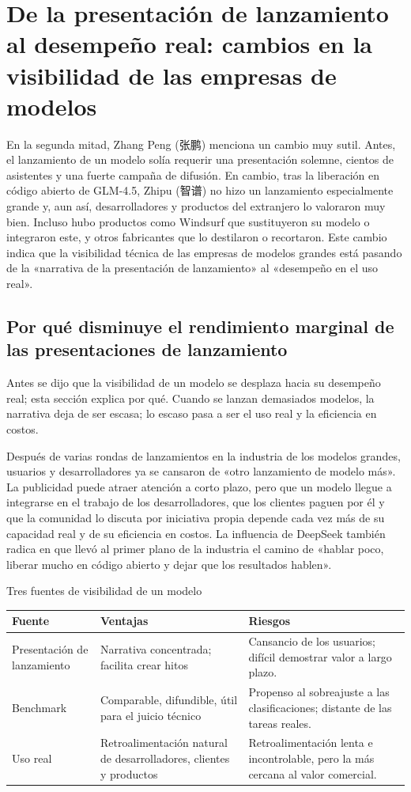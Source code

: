 \documentclass[a4paper]{article}
\begin{document}
\section{De la presentación de lanzamiento al desempeño real: cambios en la visibilidad de las empresas de modelos}

En la segunda mitad, Zhang Peng (张鹏) menciona un cambio muy sutil. Antes, el lanzamiento de un modelo solía requerir una presentación solemne, cientos de asistentes y una fuerte campaña de difusión. En cambio, tras la liberación en código abierto de GLM-4.5, Zhipu (智谱) no hizo un lanzamiento especialmente grande y, aun así, desarrolladores y productos del extranjero lo valoraron muy bien. Incluso hubo productos como Windsurf que sustituyeron su modelo o integraron este, y otros fabricantes que lo destilaron o recortaron. Este cambio indica que la visibilidad técnica de las empresas de modelos grandes está pasando de la «narrativa de la presentación de lanzamiento» al «desempeño en el uso real».

\subsection{Por qué disminuye el rendimiento marginal de las presentaciones de lanzamiento}

Antes se dijo que la visibilidad de un modelo se desplaza hacia su desempeño real; esta sección explica por qué. Cuando se lanzan demasiados modelos, la narrativa deja de ser escasa; lo escaso pasa a ser el uso real y la eficiencia en costos.

Después de varias rondas de lanzamientos en la industria de los modelos grandes, usuarios y desarrolladores ya se cansaron de «otro lanzamiento de modelo más». La publicidad puede atraer atención a corto plazo, pero que un modelo llegue a integrarse en el trabajo de los desarrolladores, que los clientes paguen por él y que la comunidad lo discuta por iniciativa propia depende cada vez más de su capacidad real y de su eficiencia en costos. La influencia de DeepSeek también radica en que llevó al primer plano de la industria el camino de «hablar poco, liberar mucho en código abierto y dejar que los resultados hablen».

\begin{knowledgebox}{Tres fuentes de visibilidad de un modelo}
\begin{tabularx}{\textwidth}{p{}p{}X}
\toprule
Fuente & Ventajas & Riesgos \\
\midrule
Presentación de lanzamiento & Narrativa concentrada; facilita crear hitos & Cansancio de los usuarios; difícil demostrar valor a largo plazo. \\
Benchmark & Comparable, difundible, útil para el juicio técnico & Propenso al sobreajuste a las clasificaciones; distante de las tareas reales. \\
Uso real & Retroalimentación natural de desarrolladores, clientes y productos & Retroalimentación lenta e incontrolable, pero la más cercana al valor comercial. \\
\bottomrule
\end{tabularx}
\end{knowledgebox}
\end{document}
